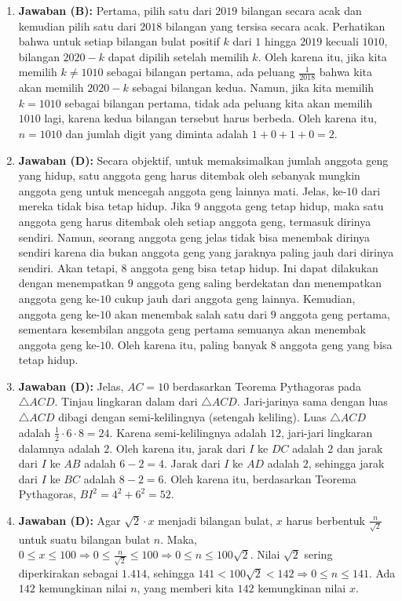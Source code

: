 \documentclass[12pt]{scrartcl}
\begin{document}
\begin{enumerate}
\item \textbf{Jawaban (B):} Pertama, pilih satu dari $2019$ bilangan secara acak dan kemudian pilih satu dari $2018$ bilangan yang tersisa secara acak. Perhatikan bahwa untuk setiap bilangan bulat positif $k$ dari $1$ hingga $2019$ kecuali $1010$, bilangan $2020-k$ dapat dipilih setelah memilih $k$. Oleh karena itu, jika kita memilih $k\ne1010$ sebagai bilangan pertama, ada peluang $\frac{1}{2018}$ bahwa kita akan memilih $2020-k$ sebagai bilangan kedua. Namun, jika kita memilih $k=1010$ sebagai bilangan pertama, tidak ada peluang kita akan memilih $1010$ lagi, karena kedua bilangan tersebut harus berbeda. Oleh karena itu, $n=1010$ dan jumlah digit yang diminta adalah $1+0+1+0=2$.

\item \textbf{Jawaban (D):} Secara objektif, untuk memaksimalkan jumlah anggota geng yang hidup, satu anggota geng harus ditembak oleh sebanyak mungkin anggota geng untuk mencegah anggota geng lainnya mati. Jelas, ke-$10$ dari mereka tidak bisa tetap hidup. Jika $9$ anggota geng tetap hidup, maka satu anggota geng harus ditembak oleh setiap anggota geng, termasuk dirinya sendiri. Namun, seorang anggota geng jelas tidak bisa menembak dirinya sendiri karena dia bukan anggota geng yang jaraknya paling jauh dari dirinya sendiri. Akan tetapi, $8$ anggota geng bisa tetap hidup. Ini dapat dilakukan dengan menempatkan $9$ anggota geng saling berdekatan dan menempatkan anggota geng ke-$10$ cukup jauh dari anggota geng lainnya. Kemudian, anggota geng ke-$10$ akan menembak salah satu dari $9$ anggota geng pertama, sementara kesembilan anggota geng pertama semuanya akan menembak anggota geng ke-$10$. Oleh karena itu, paling banyak $8$ anggota geng yang bisa tetap hidup.

\item \textbf{Jawaban (D):} Jelas, $AC=10$ berdasarkan Teorema Pythagoras pada $\triangle ACD$. Tinjau lingkaran dalam dari $\triangle ACD$. Jari-jarinya sama dengan luas $\triangle ACD$ dibagi dengan semi-kelilingnya (setengah keliling). Luas $\triangle ACD$ adalah $\frac{1}{2}\cdot6\cdot8=24$. Karena semi-kelilingnya adalah $12$, jari-jari lingkaran dalamnya adalah $2$. Oleh karena itu, jarak dari $I$ ke $DC$ adalah $2$ dan jarak dari $I$ ke $AB$ adalah $6-2=4$. Jarak dari $I$ ke $AD$ adalah $2$, sehingga jarak dari $I$ ke $BC$ adalah $8-2=6$. Oleh karena itu, berdasarkan Teorema Pythagoras, $BI^{2}=4^{2}+6^{2}=52$.

\item \textbf{Jawaban (D):} Agar $\sqrt{2}\cdot x$ menjadi bilangan bulat, $x$ harus berbentuk $\frac{n}{\sqrt{2}}$ untuk suatu bilangan bulat $n$. Maka, $0\le x\le100\Rightarrow0\le\frac{n}{\sqrt{2}}\le100\Rightarrow0\le n\le100\sqrt{2}$. Nilai $\sqrt{2}$ sering diperkirakan sebagai $1.414$, sehingga $141<100\sqrt{2}<142\Rightarrow0\le n\le141$. Ada $142$ kemungkinan nilai $n$, yang memberi kita $142$ kemungkinan nilai $x$.


\end{enumerate}
\end{document}
